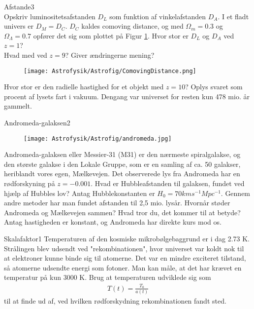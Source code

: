 \begin{opgave}{Afstande}{3}
	\\  
	\opg Opskriv luminositetsafstanden $D_L$ som funktion af vinkelafstanden $D_A$.
	\opg I et fladt univers er $D_M=D_C$. $D_C$ kaldes comoving distance, og med $\Omega_m=0.3$ og $\Omega_{\Lambda}=0.7$ opfører det sig som plottet på Figur \ref{comoving}. 
	Hvor stor er $D_L$ og $D_A$ ved $z=1$? \\
	Hvad med ved $z=9$? Giver ændringerne mening?
		\begin{figure}[h!]
			\centering
			\texttt{[image: Astrofysik/Astrofig/ComovingDistance.png]}
			\label{comoving} 
		\end{figure}
	\opg Hvor stor er den radielle hastighed for et objekt med $z=10$? Oplys svaret som procent af lysets fart i vakuum. Dengang var universet for resten kun  478 mio. år gammelt.
\end{opgave}

\begin{opgave}{Andromeda-galaksen}{2}
		\begin{figure}[h!]
			\centering
			\texttt{[image: Astrofysik/Astrofig/andromeda.jpg]}
			\label{andromeda} 
		\end{figure}
	Andromeda-galaksen eller Messier-31 (M31) er den nærmeste spiralgalakse, og den største galakse i den Lokale Gruppe, som er en samling af ca. 50 galakser, heriblandt vores egen, Mælkevejen.  
	\opg Det observerede lys fra Andromeda har en rødforskyning på $z = -0.001$.
	Hvad er Hubbleafstanden til galaksen, fundet ved hjælp af Hubbles lov? Antag Hubblekonstanten er $H_0=70 km s^{-1} Mpc^{-1}$.
	\opg Gennem andre metoder har man fundet afstanden til 2,5 mio. lysår. Hvornår støder Andromeda og Mælkevejen sammen? Hvad tror du, det kommer til at betyde? Antag hastigheden er konstant, og Andromeda har direkte kurs mod os.
\end{opgave}

\begin{opgave}{Skalafaktor}{1}
	Temperaturen af den kosmiske mikrobølgebaggrund er i dag 2.73 K. Strålingen blev udsendt ved "rekombinationen", hvor universet var koldt nok til at elektroner kunne binde sig til atomerne. Det var en mindre exciteret tilstand, så atomerne udsendte energi som fotoner. Man kan måle, at det har krævet en temperatur på kun 3000 K. Brug at temperaturen udviklede sig som
	\begin{align}
		T(t)=\frac{T_0}{a(t)}
	\end{align}
	til at finde ud af, ved hvilken rødforskydning rekombinationen fandt sted.
\end{opgave}

